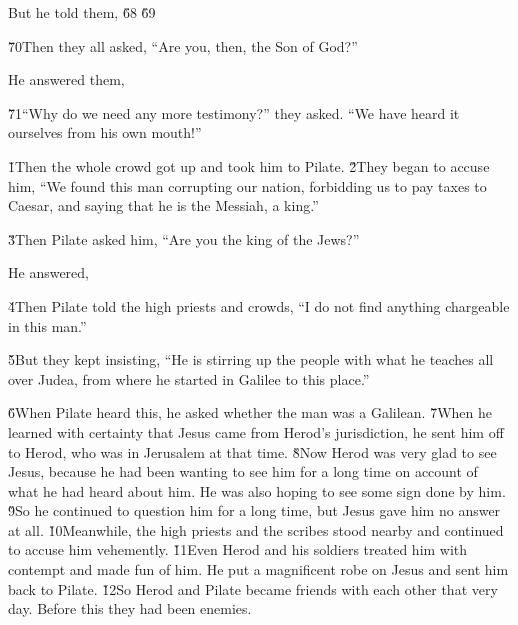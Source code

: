 But he told them,  \v{68} \v{69}

\v{70}Then they all asked, ``Are you, then, the Son of God?''

He answered them, 

\v{71}``Why do we need any more testimony?'' they asked. ``We have heard it ourselves from his own mouth!''

\v{1}Then the whole crowd got up and took him to Pilate. \v{2}They began to accuse him, ``We found this man corrupting our nation, forbidding us to pay taxes to Caesar, and saying that he is the Messiah, a king.''

\v{3}Then Pilate asked him, ``Are you the king of the Jews?''

He answered, 

\v{4}Then Pilate told the high priests and crowds, ``I do not find anything chargeable in this man.''

\v{5}But they kept insisting, ``He is stirring up the people with what he teaches all over Judea, from where he started in Galilee to this place.''

\v{6}When Pilate heard this, he asked whether the man was a Galilean. \v{7}When he learned with certainty that Jesus came from Herod's jurisdiction, he sent him off to Herod, who was in Jerusalem at that time. \v{8}Now Herod was very glad to see Jesus, because he had been wanting to see him for a long time on account of what he had heard about him. He was also hoping to see some sign done by him. \v{9}So he continued to question him for a long time, but Jesus gave him no answer at all. \v{10}Meanwhile, the high priests and the scribes stood nearby and continued to accuse him vehemently. \v{11}Even Herod and his soldiers treated him with contempt and made fun of him. He put a magnificent robe on Jesus and sent him back to Pilate. \v{12}So Herod and Pilate became friends with each other that very day. Before this they had been enemies.

